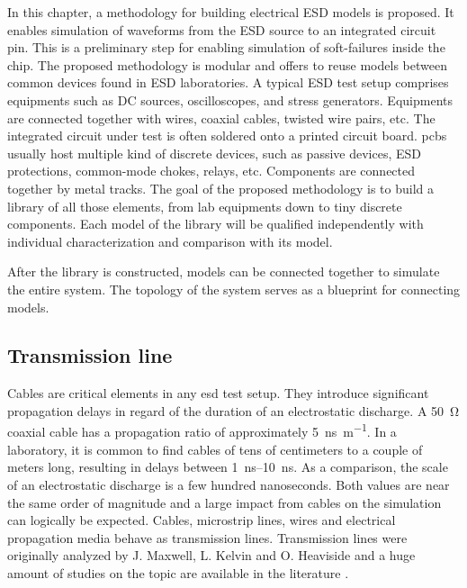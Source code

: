 In this chapter, a methodology for building electrical ESD models is proposed.
It enables simulation of waveforms from the ESD source to an integrated circuit pin.
This is a preliminary step for enabling simulation of soft-failures inside the chip.
The proposed methodology is modular and offers to reuse models between common devices found in ESD laboratories.
A typical ESD test setup comprises equipments such as DC sources, oscilloscopes, and stress generators.
Equipments are connected together with wires, coaxial cables, twisted wire pairs, etc.
The integrated circuit under test is often soldered onto a printed circuit board.
\gls{pcb}s usually host multiple kind of discrete devices, such as passive devices, ESD protections, common-mode chokes, relays, etc.
Components are connected together by metal tracks.
The goal of the proposed methodology is to build a library of all those elements, from lab equipments down to tiny discrete components.
Each model of the library will be qualified independently with individual characterization and comparison with its model.

After the library is constructed, models can be connected together to simulate the entire system.
The topology of the system serves as a blueprint for connecting models.

\subsection{Transmission line}

Cables are critical elements in any \gls{esd} test setup.
They introduce significant propagation delays in regard of the duration of an electrostatic discharge.
A \SI{50}{\ohm} coaxial cable has a propagation ratio of approximately \SI{5}{\nano\second\per\metre}.
In a laboratory, it is common to find cables of tens of centimeters to a couple of meters long, resulting in delays between \SIrange{1}{10}{\nano\second}.
As a comparison, the scale of an electrostatic discharge is a few hundred nanoseconds.
Both values are near the same order of magnitude and a large impact from cables on the simulation can logically be expected.
Cables, microstrip lines, wires and electrical propagation media behave as transmission lines.
Transmission lines were originally analyzed by J. Maxwell, L. Kelvin and O. Heaviside and a huge amount of studies on the topic are available in the literature \cite{branin-tl-ref, hf-coax,lossy-tl,emc-analysis-tl}.

